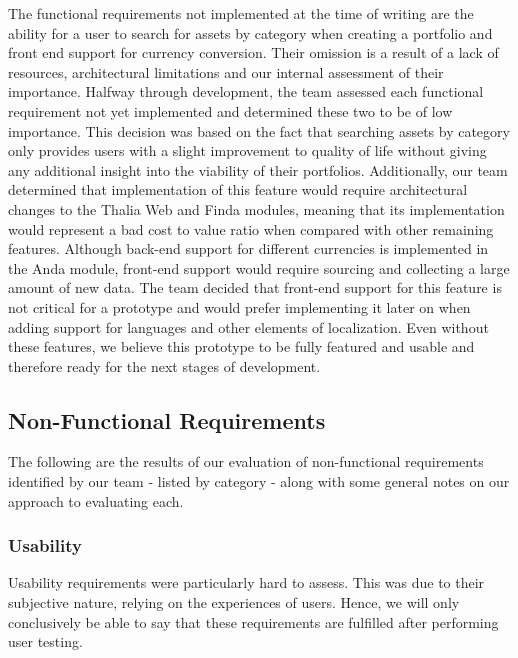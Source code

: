 \documentclass[main.tex]{subfiles}
\begin{document}
The functional requirements not implemented at the time of writing are the ability for a user to search for assets by category when creating a portfolio and front end support for currency conversion. Their omission is a result of a lack of resources, architectural limitations and our internal assessment of their importance. Halfway through development, the team assessed each functional requirement not yet implemented and determined these two to be of low importance. This decision was based on the fact that searching assets by category only provides users with a slight improvement to quality of life without giving any additional insight into the viability of their portfolios. Additionally, our team determined that implementation of this feature would require architectural changes to the Thalia Web and Finda modules, meaning that its implementation would represent a bad cost to value ratio when compared with other remaining features. Although back-end support for different currencies is implemented in the Anda module, front-end support would require sourcing and collecting a large amount of new data. The team decided that front-end support for this feature is not critical for a prototype and would prefer implementing it later on when adding support for languages and other elements of localization. Even without these features, we believe this prototype to be fully featured and usable and therefore ready for the next stages of development.

\subsection{Non-Functional Requirements}
The following are the results of our evaluation of non-functional requirements identified by our team - listed by category - along with some general notes on our approach to evaluating each.

\subsubsection{Usability}
Usability requirements were particularly hard to assess. This was due to their subjective nature, relying on the experiences of users. Hence, we will only conclusively be able to say that these requirements are fulfilled after performing user testing.
\end{document}
